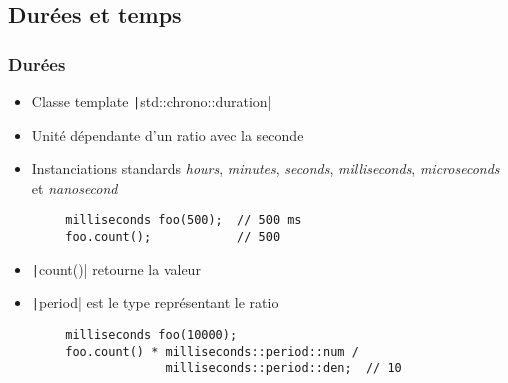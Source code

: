 \documentclass[C++.tex]{subfiles}
\begin{document}
\subsection*{Durées et temps}
\begin{frame}[fragile]
	\frametitle{Durées}
	\begin{itemize}
		\item Classe template \texttt|std::chrono::duration|
		\item Unité dépendante d'un ratio avec la seconde
		\item Instanciations standards \textit{hours}, \textit{minutes}, \textit{seconds}, \textit{milliseconds}, \textit{microseconds} et \textit{nanosecond}
	\end{itemize}

	\begin{verbatim}
		milliseconds foo(500);  // 500 ms
		foo.count();            // 500
	\end{verbatim}

	\begin{itemize}
		\item \texttt|count()| retourne la valeur
		\item \texttt|period| est le type représentant le ratio
	\end{itemize}

	\begin{verbatim}
		milliseconds foo(10000);
		foo.count() * milliseconds::period::num / 
		              milliseconds::period::den;  // 10
	\end{verbatim}
\end{frame}
\end{document}
